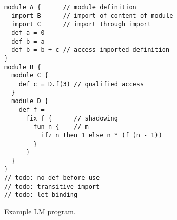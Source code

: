 \begin{figure}[t]
\begin{lstlisting}
module A {      // module definition
  import B      // import of content of module
  import C      // import through import
  def a = 0      
  def b = a  
  def b = b + c // access imported definition
}
module B {
  module C {
    def c = D.f(3) // qualified access
  }
  module D {
    def f = 
      fix f {      // shadowing 
        fun n {    // m
          ifz n then 1 else n * (f (n - 1))
        } 
      }
  }
}
// todo: no def-before-use
// todo: transitive import
// todo: let binding
\end{lstlisting}
\caption{Example LM program.}
\end{figure}
